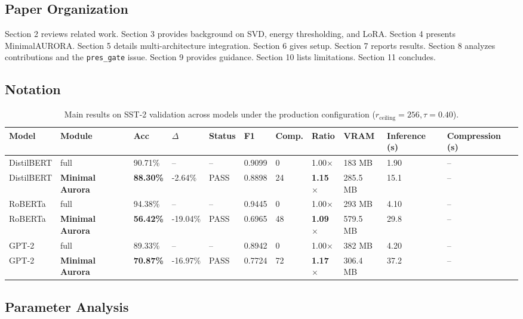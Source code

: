 \subsection{Paper Organization}

Section 2 reviews related work. Section 3 provides background on SVD, 
energy thresholding, and LoRA. Section 4 presents MinimalAURORA. Section 5 
details multi-architecture integration. Section 6 gives setup. Section 7 
reports results. Section 8 analyzes contributions and the \texttt{pres\_gate} 
issue. Section 9 provides guidance. Section 10 lists limitations. Section 
11 concludes.



\subsection{Notation}

\begin{table}[t]
\centering
\small
\begin{tabular}{lllllllllll}
\toprule
\textbf{Model} & \textbf{Module} & \textbf{Acc} & \textbf{$\Delta$} & \textbf{Status} & \textbf{F1} & \textbf{Comp.} & \textbf{Ratio} & \textbf{VRAM} & \textbf{Inference (s)} & \textbf{Compression (s)} \\
\midrule
DistilBERT & full & 90.71\% & -- & -- & 0.9099 & 0 & 1.00$\times$ & 183 MB & 1.90 & -- \\
DistilBERT & \textbf{Minimal Aurora} & \textbf{88.30\%} & -2.64\% & PASS & 0.8898 & 24 & \textbf{1.15$\times$} & 285.5 MB & 15.1 & -- \\
RoBERTa & full & 94.38\% & -- & -- & 0.9445 & 0 & 1.00$\times$ & 293 MB & 4.10 & -- \\
RoBERTa & \textbf{Minimal Aurora} & \textbf{56.42\%} & -19.04\% & PASS & 0.6965 & 48 & \textbf{1.09$\times$} & 579.5 MB & 29.8 & -- \\
GPT-2 & full & 89.33\% & -- & -- & 0.8942 & 0 & 1.00$\times$ & 382 MB & 4.20 & -- \\
GPT-2 & \textbf{Minimal Aurora} & \textbf{70.87\%} & -16.97\% & PASS & 0.7724 & 72 & \textbf{1.17$\times$} & 306.4 MB & 37.2 & -- \\
\bottomrule
\end{tabular}
\caption{Main results on SST-2 validation across models under the production configuration ($r_{\mathrm{ceiling}}=256, \tau=0.40$).}
\label{tab:main_sst2}
\end{table}

\subsection{Parameter Analysis}


